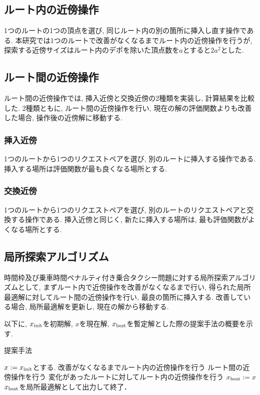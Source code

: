 \subsection{ルート内の近傍操作}
1つのルートの1つの頂点を選び, 同じルート内の別の箇所に挿入し直す操作である. 本研究では1つのルートで改善がなくなるまでルート内の近傍操作を行うが, 探索する近傍サイズはルート内のデポを除いた頂点数を$a$とすると$2a^2$とした.

\subsection{ルート間の近傍操作}
ルート間の近傍操作では, 挿入近傍と交換近傍の2種類を実装し, 計算結果を比較した. 2種類ともに, ルート間の近傍操作を行い, 現在の解の評価関数よりも改善した場合, 操作後の近傍解に移動する.
\subsubsection{挿入近傍}
1つのルートから1つのリクエストペアを選び, 別のルートに挿入する操作である. 挿入する場所は評価関数が最も良くなる場所とする.
\subsubsection{交換近傍}
1つのルートから1つのリクエストペアを選び, 別のルートのリクエストペアと交換する操作である. 挿入近傍と同じく, 新たに挿入する場所は, 最も評価関数がよくなる場所とする.
\subsection{局所探索アルゴリズム}
時間枠及び乗車時間ペナルティ付き乗合タクシー問題に対する局所探索アルゴリズムとして, まずルート内で近傍操作を改善がなくなるまで行い, 得られた局所最適解に対してルート間の近傍操作を行い, 最良の箇所に挿入する. 改善している場合, 局所最適解を更新し, 現在の解から移動する.

以下に, $x_{\rm init}$を初期解, $x$を現在解, $x_{\rm best}$を暫定解とした際の提案手法の概要を示す.
\begin{algorithm}
 \caption{提案手法}
 \label{algo1}
 \begin{algorithmic}[1]%
  \STATE $x := x_{\rm init}$とする.
  \STATE 改善がなくなるまでルート内の近傍操作を行う
  \STATE ルート間の近傍操作を行う
  \STATE 変化があったルートに対してルート内の近傍操作を行う
  \STATE  $x_{\rm best} := x$
  \ENDIF
  \STATE $x_{\rm best}$を局所最適解として出力して終了．
 \end{algorithmic}
\end{algorithm}
